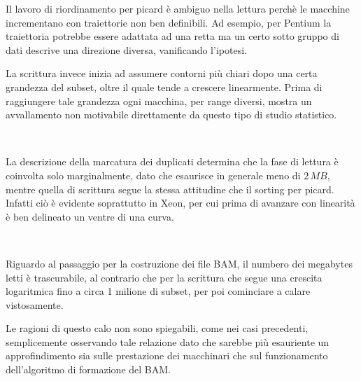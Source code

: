 Il lavoro di riordinamento per picard è ambiguo nella lettura perchè le macchine incrementano con traiettorie non ben definibili.
Ad esempio, per Pentium la traiettoria potrebbe essere adattata ad una retta ma un certo sotto gruppo di dati descrive una direzione diversa, vanificando l'ipotesi.

La scrittura invece inizia ad assumere contorni più chiari dopo una certa grandezza del subset, oltre il quale tende a crescere linearmente. 
Prima di raggiungere tale grandezza ogni macchina, per range diversi, mostra un avvallamento non motivabile direttamente da questo tipo di studio statistico.  

\begin{figure}[H]
\centering
{} \quad
{} \\
\caption{}
\label{fig:IOMd}
\end{figure}

La descrizione della marcatura dei duplicati determina che la fase di lettura è coinvolta solo marginalmente, dato che esaurisce in generale meno di $2\,MB$, mentre quella di scrittura segue la stessa attitudine che il sorting per picard.
Infatti ciò è evidente soprattutto in Xeon, per cui prima di avanzare con linearità è ben delineato un ventre di una curva.  

\begin{figure}[H]
\centering
{} \quad
{} \\
\caption{}
\label{fig:IOBB}
\end{figure}

Riguardo al passaggio per la costruzione dei file BAM, il numbero dei megabytes letti è trascurabile, al contrario che per la scrittura che segue una crescita logaritmica fino a circa 1 milione di subset, per poi cominciare a calare vistosamente.

Le ragioni di questo calo non sono spiegabili, come nei casi precedenti, semplicemente osservando tale relazione dato che sarebbe più esauriente un approfindimento sia sulle prestazione dei macchinari che sul funzionamento dell'algoritmo di formazione del BAM. 

